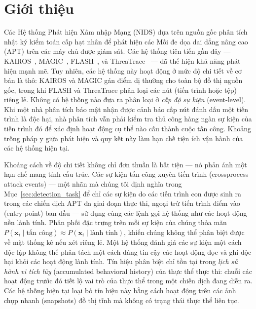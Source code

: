 \documentclass[letterpaper,twocolumn,10pt]{article}
\begin{document}
\section{Giới thiệu}
\label{sec:introduction}

Các Hệ thống Phát hiện Xâm nhập Mạng (NIDS) dựa trên nguồn gốc phân tích nhật ký kiểm toán cấp hạt nhân để phát hiện các Mối đe dọa dai dẳng nâng cao (APT) trên các máy chủ được giám sát. Các hệ thống tiên tiến gần đây --- KAIROS~\cite{cheng2024kairos}, MAGIC~\cite{jia2024magic}, FLASH~\cite{rehman2024flash}, và ThreaTrace~\cite{Wang2021THREATRACEDA} --- đã thể hiện khả năng phát hiện mạnh mẽ. Tuy nhiên, các hệ thống này hoạt động ở mức độ chi tiết về cơ bản là thô: KAIROS và MAGIC gán điểm dị thường cho toàn bộ đồ thị nguồn gốc, trong khi FLASH và ThreaTrace phân loại các nút (tiến trình hoặc tệp) riêng lẻ. Không có hệ thống nào đưa ra phân loại ở \emph{cấp độ sự kiện} (event-level). Khi một nhà phân tích bảo mật nhận được cảnh báo cấp nút đánh dấu một tiến trình là độc hại, nhà phân tích vẫn phải kiểm tra thủ công hàng ngàn sự kiện của tiến trình đó để xác định hoạt động cụ thể nào cấu thành cuộc tấn công. Khoảng trống pháp y giữa phát hiện và quy kết này làm hạn chế tiện ích vận hành của các hệ thống hiện tại.

Khoảng cách về độ chi tiết không chỉ đơn thuần là bất tiện --- nó phản ánh một hạn chế mang tính cấu trúc. Các sự kiện tấn công xuyên tiến trình (crossprocess attack events) --- một nhãn mà chúng tôi định nghĩa trong Mục~\ref{sec:detection_task} để chỉ các sự kiện do các tiến trình con được sinh ra trong các chiến dịch APT đa giai đoạn thực thi, ngoại trừ tiến trình điểm vào (entry-point) ban đầu --- sử dụng cùng các lệnh gọi hệ thống như các hoạt động nền lành tính. Phân phối đặc trưng trên mỗi sự kiện của chúng thỏa mãn $P(\mathbf{x}_i \mid \text{tấn công}) \approx P(\mathbf{x}_i \mid \text{lành tính})$, khiến chúng không thể phân biệt được về mặt thống kê nếu xét riêng lẻ. Một hệ thống đánh giá các sự kiện một cách độc lập không thể phân tách một cách đáng tin cậy các hoạt động đọc và ghi độc hại khỏi các hoạt động lành tính. Tín hiệu phân biệt chỉ tồn tại trong \emph{lịch sử hành vi tích lũy} (accumulated behavioral history) của thực thể thực thi: chuỗi các hoạt động trước đó tiết lộ vai trò của thực thể trong một chiến dịch đang diễn ra. Các hệ thống hiện tại loại bỏ tín hiệu này bằng cách hoạt động trên các ảnh chụp nhanh (snapshots) đồ thị tĩnh mà không có trạng thái thực thể liên tục.
\end{document}
